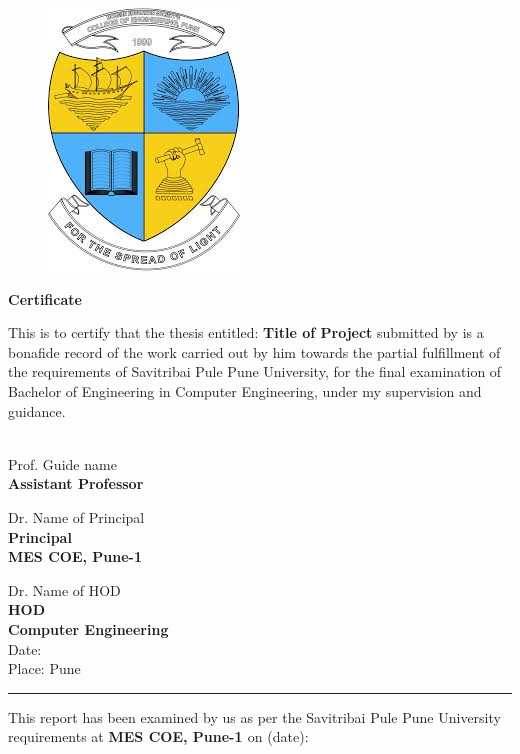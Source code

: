 \begin{figure}[!h]
\centering
\includegraphics[scale=0.4]{mes.jpg}\\
\end{figure}

\vspace{0.4cm}
\hspace*{-0.5cm}
\begin{center}{\Large \bf {Certificate}}
\end{center}
This is to certify that the thesis entitled:\/  
{\bf{Title of Project}}\/ \/
submitted by 
is a bonafide record of the work carried out by him towards the partial fulfillment of
the requirements of Savitribai Pule Pune University, for the final examination of Bachelor of Engineering in Computer Engineering, under my supervision and guidance.\\ \\ 

\vspace*{0.5cm}
\begin{flushright}
Prof. Guide name\\
{\bf{Assistant Professor}}
\end{flushright}

\vspace*{2cm}
\begin{flushright}
Dr. Name of Principal\\
{\bf{Principal}}\\
{\bf{MES COE, Pune-1}}\\
\end{flushright}

\vspace{-2.2cm}
\hspace*{-0.6cm}Dr. Name of HOD\\
{\bf{HOD}}\\
{\bf{Computer Engineering\\}}
Date:\\
Place:\; Pune\\
\hrule
\vspace{0.5cm}
\hspace*{-0.7cm} This report has been examined by us as per the Savitribai Pule Pune University requirements at
{\bf{MES COE, Pune-1 }}on (date):\\

